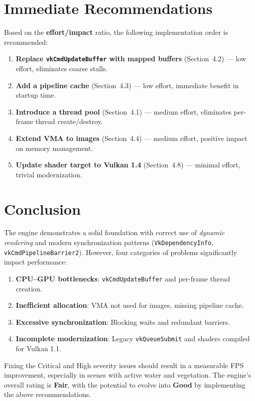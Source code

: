 \documentclass[a4paper,10pt]{article}
\begin{document}
\section{Immediate Recommendations}

Based on the \textbf{effort/impact} ratio, the following implementation order is
recommended:

\begin{enumerate}
    \item \textbf{Replace \texttt{vkCmdUpdateBuffer} with mapped buffers}
          (Section~4.2) --- low effort, eliminates coarse stalls.
    \item \textbf{Add a pipeline cache} (Section~4.3) --- low effort,
          immediate benefit in startup time.
    \item \textbf{Introduce a thread pool} (Section~4.1) --- medium effort,
          eliminates per-frame thread create/destroy.
    \item \textbf{Extend VMA to images} (Section~4.4) --- medium effort,
          positive impact on memory management.
    \item \textbf{Update shader target to Vulkan 1.4}
          (Section~4.8) --- minimal effort, trivial modernization.
\end{enumerate}

\section{Conclusion}

The engine demonstrates a solid foundation with correct use of
\textit{dynamic rendering} and modern synchronization patterns (\texttt{VkDependencyInfo},
\texttt{vkCmdPipelineBarrier2}). However, four categories of problems
significantly impact performance:

\begin{enumerate}[nosep]
    \item \textbf{CPU--GPU bottlenecks}: \texttt{vkCmdUpdateBuffer} and per-frame
          thread creation.
    \item \textbf{Inefficient allocation}: VMA not used for images, missing
          pipeline cache.
    \item \textbf{Excessive synchronization}: Blocking waits and redundant
          barriers.
    \item \textbf{Incomplete modernization}: Legacy \texttt{vkQueueSubmit} and
          shaders compiled for Vulkan 1.1.
\end{enumerate}

Fixing the Critical and High severity issues should result in a measurable FPS
improvement, especially in scenes with active water and vegetation. The engine's
overall rating is \textbf{Fair}, with the potential to evolve into \textbf{Good}
by implementing the above recommendations.
\end{document}
